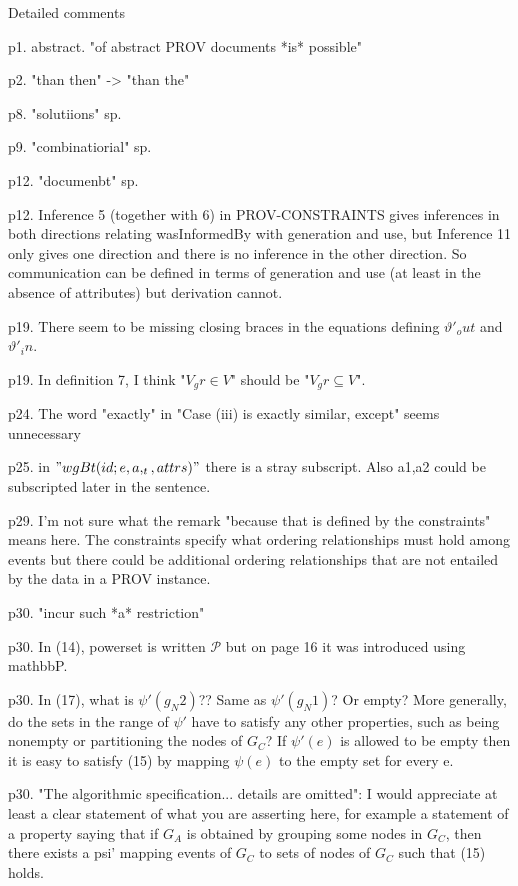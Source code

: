 \documentclass{article}
\begin{document}
Detailed comments

p1. abstract. "of abstract PROV documents *is* possible"

p2. "than then" -> "than the"

p8. "solutiions" sp.

p9. "combinatiorial" sp.

p12. "documenbt" sp.

p12. Inference 5 (together with 6) in PROV-CONSTRAINTS gives inferences in both directions relating wasInformedBy with generation and use, but Inference 11 only gives one direction and there is no inference in the other direction. So communication can be defined in terms of generation and use (at least in the absence of attributes) but derivation cannot. 

p19.  There seem to be missing closing braces in the equations defining $\vartheta'_out$ and $\vartheta'_in$.

p19.  In definition 7, I think "$V_gr \in V$" should be "$V_gr \subseteq V$".

p24.  The word "exactly" in "Case (iii) is exactly similar, except" seems unnecessary

p25.  in $"wgBt(id;e,a,_t,attrs)"$ there is a stray subscript.  Also a1,a2 could be subscripted later in the sentence.

p29.  I'm not sure what the remark "because that is defined by the constraints" means here.  The constraints specify what ordering relationships must hold among events but there could be additional ordering relationships that are not entailed by the data in a PROV instance.

p30. "incur such *a* restriction"


p30.  In (14), powerset is written  $\mathcal{P}$ but on page 16 it was introduced using mathbb{P}.

p30. In (17), what is $\psi'(g_N2)$??  Same as $\psi'(g_N1)$?  Or empty?  More generally, do the sets in the range of $\psi'$ have to satisfy any other properties, such as being nonempty or partitioning the nodes of $G_C$?  If $\psi'(e)$ is allowed to be empty then it is easy to satisfy (15) by mapping $\psi(e)$ to the empty set for every e.

p30. "The algorithmic specification... details are omitted": I would appreciate at least a clear statement of what you are asserting here, for example a statement of a property saying that if $G_A$ is obtained by grouping some nodes in $G_C$, then there exists a psi' mapping events of $G_C$ to sets of nodes of $G_C$ such that (15) holds.  
\end{document}
